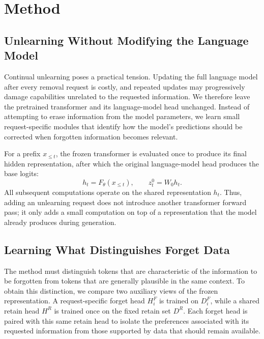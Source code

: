 \documentclass[11pt]{article}
\begin{document}
\section{Method}

\subsection{Unlearning Without Modifying the Language Model}

Continual unlearning poses a practical tension. Updating the full language model after every removal request is costly, and repeated updates may progressively damage capabilities unrelated to the requested information. We therefore leave the pretrained transformer and its language-model head unchanged. Instead of attempting to erase information from the model parameters, we learn small request-specific modules that identify how the model's predictions should be corrected when forgotten information becomes relevant.

For a prefix $x_{\leq t}$, the frozen transformer is evaluated once to produce its final hidden representation, after which the original language-model head produces the base logits:
\begin{equation}
    h_t = F_\theta(x_{\leq t}),
    \qquad
    z_t^0 = W_0 h_t.
\end{equation}
All subsequent computations operate on the shared representation $h_t$. Thus, adding an unlearning request does not introduce another transformer forward pass; it only adds a small computation on top of a representation that the model already produces during generation.

\subsection{Learning What Distinguishes Forget Data}

The method must distinguish tokens that are characteristic of the information to be forgotten from tokens that are generally plausible in the same context. To obtain this distinction, we compare two auxiliary views of the frozen representation. A request-specific forget head $H_i^F$ is trained on $D_i^F$, while a shared retain head $H^R$ is trained once on the fixed retain set $D^R$. Each forget head is paired with this same retain head to isolate the preferences associated with its requested information from those supported by data that should remain available.
\end{document}
